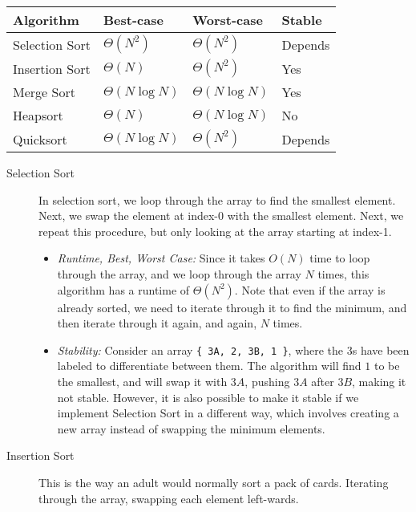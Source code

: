\begin{solution}
{
\renewcommand{\arraystretch}{2}
\setlength{\tabcolsep}{12pt}
\begin{tabularx}{\textwidth}{Xlll}
Algorithm         & Best-case          & Worst-case          & Stable \\\hline
Selection Sort    & $\Theta(N^2)$      & $\Theta(N^2)$       & Depends\\
Insertion Sort    & $\Theta(N)$        & $\Theta(N^2)$       & Yes    \\
Merge Sort        & $\Theta(N \log N)$ & $\Theta(N \log N)$  & Yes    \\
Heapsort          & $\Theta(N)$        & $\Theta(N \log N)$  & No	  \\
Quicksort         & $\Theta(N \log N)$        & $\Theta(N^2)$       & Depends
\end{tabularx}
}

\begin{description}
\item[Selection Sort]
In selection sort, we loop through the array to find the smallest element.
Next, we swap the element at index-0 with the smallest element. Next, we repeat
this procedure, but only looking at the array starting at index-1.

\begin{itemize}
\item \textit{Runtime, Best, Worst Case:} Since it takes $O(N)$ time to loop
through the array, and we loop through the array $N$ times, this algorithm has
a runtime of $\Theta(N^2)$. Note that even if the array is already sorted, we
need to iterate through it to find the minimum, and then iterate through it
again, and again, $N$ times.
\item \textit{Stability:} Consider an array \lstinline${ 3A, 2, 3B, 1 }$, where
the $3$s have been labeled to differentiate between them. The algorithm will
find $1$ to be the smallest, and will swap it with $3A$, pushing $3A$ after
$3B$, making it not stable. However, it is also possible to make it stable if
we implement Selection Sort in a different way, which involves creating a new
array instead of swapping the minimum elements.
\end{itemize}

\item[Insertion Sort]
This is the way an adult would normally sort a pack of cards. Iterating through
the array, swapping each element left-wards.


\end{description}
\end{solution}
